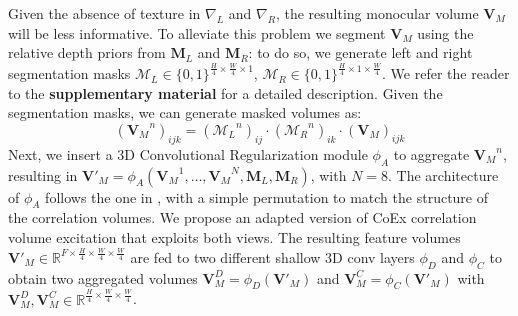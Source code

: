 Given the absence of texture in $\nabla_L$ and $\nabla_R$, the resulting monocular volume $\mathbf{V}_M$ will be less informative. 
To alleviate this problem we segment $\mathbf{V}_M$ using the relative depth priors from $\mathbf{M}_L$ and $\mathbf{M}_R$: to do so, we generate left and right segmentation masks $\mathcal{M}_L \in \{0,1\}^{\frac{H}{4} \times \frac{W}{4} \times 1}$, $\mathcal{M}_R \in \{0,1\}^{\frac{H}{4} \times 1 \times \frac{W}{4}}$.
We refer the reader to the \textbf{supplementary material} for a detailed description.
Given the segmentation masks, we can generate masked volumes as:
\begin{equation}
    ({\mathbf{V}_M}^n)_{ijk} = ({\mathcal{M}_L}^n)_{ij} \cdot ({\mathcal{M}_R}^n)_{ik} \cdot (\mathbf{V}_M)_{ijk}
    \label{eq:vol_masking}
\end{equation}
Next, we insert a 3D Convolutional Regularization module $\phi_A$ to aggregate ${\mathbf{V}_M}^n$, resulting in ${\mathbf{V}'}_M=\phi_A({\mathbf{V}_M}^1,\dots,{\mathbf{V}_M}^{N},\mathbf{M}_L,\mathbf{M}_R)$, with $N=8$. The architecture of $\phi_A$ follows the one in \cite{xu2023iterative}, with a simple permutation to match the structure of the correlation volumes.
We propose an adapted version of CoEx \cite{bangunharcana2021correlate} correlation volume excitation that exploits both views. 
The resulting feature volumes ${\mathbf{V}'}_M \in \mathbb{R}^{F \times \frac{H}{4} \times \frac{W}{4} \times \frac{W}{4}}$ are fed to two different shallow 3D conv layers $\phi_D$ and $\phi_C$ to obtain two aggregated volumes $\mathbf{V}^D_M = \phi_D({\mathbf{V}'}_M)$ and $\mathbf{V}^C_M = \phi_C({\mathbf{V}'}_M)$ with $\mathbf{V}^D_M,\mathbf{V}^C_M \in \mathbb{R}^{\frac{H}{4} \times \frac{W}{4} \times \frac{W}{4}}$.


